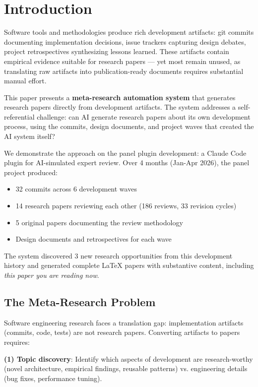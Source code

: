 \section{Introduction}

Software tools and methodologies produce rich development artifacts: git commits documenting implementation decisions, issue trackers capturing design debates, project retrospectives synthesizing lessons learned. These artifacts contain empirical evidence suitable for research papers — yet most remain unused, as translating raw artifacts into publication-ready documents requires substantial manual effort.

This paper presents a \textbf{meta-research automation system} that generates research papers directly from development artifacts. The system addresses a self-referential challenge: can AI generate research papers about its own development process, using the commits, design documents, and project waves that created the AI system itself?

We demonstrate the approach on the panel plugin development: a Claude Code plugin for AI-simulated expert review. Over 4 months (Jan-Apr 2026), the panel project produced:
\begin{itemize}
\item 32 commits across 6 development waves
\item 14 research papers reviewing each other (186 reviews, 33 revision cycles)
\item 5 original papers documenting the review methodology
\item Design documents and retrospectives for each wave
\end{itemize}

The system discovered 3 new research opportunities from this development history and generated complete LaTeX papers with substantive content, including \textit{this paper you are reading now}.

\subsection{The Meta-Research Problem}

Software engineering research faces a translation gap: implementation artifacts (commits, code, tests) are not research papers. Converting artifacts to papers requires:

\textbf{(1) Topic discovery}: Identify which aspects of development are research-worthy (novel architecture, empirical findings, reusable patterns) vs. engineering details (bug fixes, performance tuning).

